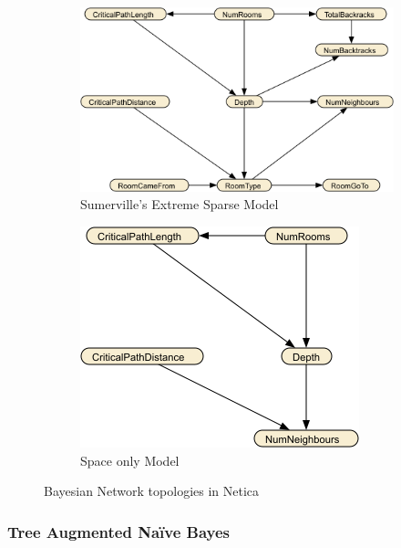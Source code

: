 \documentclass{UoYCSproject}
\begin{document}
\begin{figure}[htb]
  \centering
  \begin{subfigure}[b]{0.55\textwidth}
    \centering
    \includegraphics[width=\textwidth]{SESM_full.png}
    \caption{Sumerville's Extreme Sparse Model}
  \end{subfigure}
  \hfill
  \begin{subfigure}[b]{0.35\textwidth}
    \centering
    \includegraphics[width=\textwidth]{SESM_space.png}
    \caption{Space only Model}
  \end{subfigure}
  \caption{Bayesian Network topologies in Netica}
  \label{fig:SESM}
\end{figure}

\subsubsection{Tree Augmented Na\"{i}ve Bayes}
\end{document}
